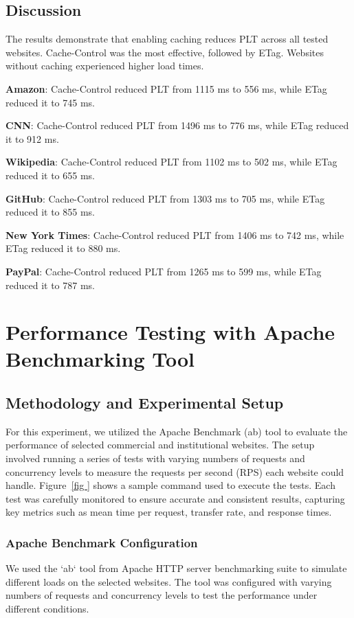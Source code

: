 \documentclass[a4paper,10pt]{article}
\begin{document}
\subsection{Discussion}
The results demonstrate that enabling caching reduces PLT across all tested websites. Cache-Control was the most effective, followed by ETag. Websites without caching experienced higher load times.

\textbf{Amazon}: Cache-Control reduced PLT from 1115 ms to 556 ms, while ETag reduced it to 745 ms.

\textbf{CNN}: Cache-Control reduced PLT from 1496 ms to 776 ms, while ETag reduced it to 912 ms.

\textbf{Wikipedia}: Cache-Control reduced PLT from 1102 ms to 502 ms, while ETag reduced it to 655 ms.

\textbf{GitHub}: Cache-Control reduced PLT from 1303 ms to 705 ms, while ETag reduced it to 855 ms.

\textbf{New York Times}: Cache-Control reduced PLT from 1406 ms to 742 ms, while ETag reduced it to 880 ms.

\textbf{PayPal}: Cache-Control reduced PLT from 1265 ms to 599 ms, while ETag reduced it to 787 ms.

\section{Performance Testing with Apache Benchmarking Tool}

\subsection{Methodology and Experimental Setup}
For this experiment, we utilized the Apache Benchmark (ab) tool to evaluate the performance of selected commercial and institutional websites. The setup involved running a series of tests with varying numbers of requests and concurrency levels to measure the requests per second (RPS) each website could handle. Figure~\ref{fig
} shows a sample command used to execute the tests. Each test was carefully monitored to ensure accurate and consistent results, capturing key metrics such as mean time per request, transfer rate, and response times.

\subsubsection{Apache Benchmark Configuration}
We used the `ab` tool from Apache HTTP server benchmarking suite to simulate different loads on the selected websites. The tool was configured with varying numbers of requests and concurrency levels to test the performance under different conditions.
\end{document}
